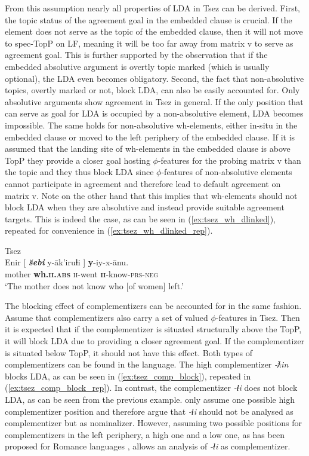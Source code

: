 \documentclass[output=paper
,modfonts
,nonflat]{langsci/langscibook}
\begin{document}
From this assumption nearly all properties of LDA in Tsez can be derived. First, the topic status of the agreement goal in the embedded clause is crucial. If the element does not serve as the topic of the embedded clause, then it will not move to spec-TopP on LF, meaning it will be too far away from matrix v to serve as agreement goal. This is further supported by the observation that if the embedded absolutive argument is overtly topic marked (which is usually optional), the LDA even becomes obligatory. Second, the fact that non-absolutive topics, overtly marked or not, block LDA, can also be easily accounted for. Only absolutive arguments show agreement in Tsez in general. If the only position that can serve as goal for LDA is occupied by a non-absolutive element, LDA becomes impossible. The same holds for non-absolutive wh-elements, either in-situ in the embedded clause or moved to the left periphery of the embedded clause. If it is assumed that the landing site of wh-elements in the embedded clause is above TopP they provide a closer goal hosting $ \phi $-features for the probing matrix v than the topic and they thus block LDA since $ \phi $-features of non-absolutive elements cannot participate in agreement and therefore lead to default agreement on matrix v. Note on the other hand that this implies that wh-elements should not block LDA when they are absolutive and instead provide suitable agreement targets. This is indeed the case, as can be seen in (\ref{ex:tsez_wh_dlinked}), repeated for convenience in (\ref{ex:tsez_wh_dlinked_rep}).
\begin{exe}
\ex Tsez \citep[][fn. 20]{Polinsky_Potsdam2001}\label{ex:tsez_wh_dlinked_rep}\\
	\gll Enir [ \textbf{\textit{\u{s}ebi}} y-\=ak'iruɬi ] \textbf{y}-iy-x-\={a}nu.\\
		 mother {} \textbf{wh.\textsc{ii.abs}} \textsc{ii}-went {} \textbf{\textsc{ii}}-know-\textsc{prs-neg}\\
	\glt `The mother does not know who [of women] left.'
\end{exe}
The blocking effect of complementizers can be accounted for in the same fashion. Assume that complementizers also carry a set of valued $ \phi $-features in Tsez. Then it is expected that if the complementizer is situated structurally above the TopP, it will block LDA due to providing a closer agreement goal. If the complementizer is situated below TopP, it should not have this effect. Both types of complementizers can be found in the language. The high complementizer \textit{-ƛin} blocks LDA, as can be seen in (\ref{ex:tsez_comp_block}), repeated in (\ref{ex:tsez_comp_block_rep}). In contrast, the complementizer \textit{-ɬi} does not block LDA, as can be seen from the previous example. \citet{Polinsky_Potsdam2001} only assume one possible high complementizer position and therefore argue that \textit{-ɬi} should not be analysed as complementizer but as nominalizer. However, assuming two possible positions for complementizers in the left periphery, a high one and a low one, as has been proposed for Romance languages \citep{Ledgeway2005}, allows an analysis of \textit{-ɬi} as complementizer.
\end{document}
